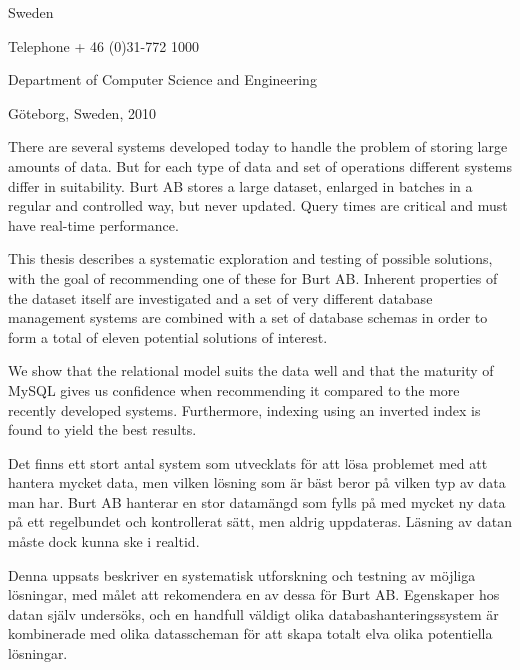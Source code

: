 \noindent Sweden

\noindent Telephone + 46 (0)31-772 1000

\vfill

\noindent Department of Computer Science and Engineering

\noindent G{\"o}teborg, Sweden, 2010

\pagebreak

\vspace{12pt}

\noindent There are several systems developed today to handle the problem of storing large amounts of data. But for each type of data and set of operations different systems differ in suitability. Burt AB stores a large dataset, enlarged in batches in a regular and controlled way, but never updated. Query times are critical and must have real-time performance.

This thesis describes a systematic exploration and testing of possible solutions, with the goal of recommending one of these for Burt AB. Inherent properties of the dataset itself are investigated and a set of very different database management systems are combined with a set of database schemas in order to form a total of eleven potential solutions of interest.

We show that the relational model suits the data well and that the maturity of MySQL gives us confidence when recommending it compared to the more recently developed systems. Furthermore, indexing using an inverted index is found to yield the best results.

\vspace{48pt}

\vspace{12pt}


\noindent Det finns ett stort antal system som utvecklats f{\"o}r att l{\"o}sa problemet med att hantera mycket data, men vilken l{\"o}sning som {\"a}r b{\"a}st beror p{\aa} vilken typ av data man har. Burt AB hanterar en stor datam{\"a}ngd som fylls p{\aa} med mycket ny data p{\aa} ett regelbundet och kontrollerat s{\"a}tt, men aldrig uppdateras. L{\"a}sning av datan m{\aa}ste dock kunna ske i realtid.

Denna uppsats beskriver en systematisk utforskning och testning av m{\"o}jliga l{\"o}sningar, med m{\aa}let att rekomendera en av dessa f{\"o}r Burt AB. Egenskaper hos datan sj{\"a}lv unders{\"o}ks, och en handfull v{\"a}ldigt olika databashanteringssystem {\"a}r kombinerade med olika datasscheman f{\"o}r att skapa totalt elva olika potentiella l{\"o}sningar.

